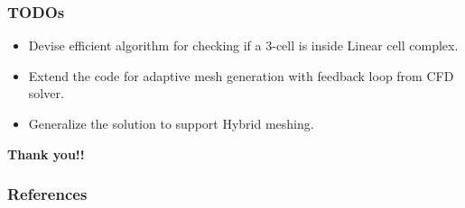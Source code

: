 \documentclass{beamer}
\begin{document}
	\begin{frame}
		\frametitle{TODOs}
			\begin{itemize}
				\item Devise efficient algorithm for checking if a 3-cell is inside Linear cell complex.
				\item Extend the code for adaptive mesh generation with feedback loop from CFD solver. 
				\item Generalize the solution to support Hybrid meshing. 		
			\end{itemize}
		\end{frame}	
	\begin{frame}
		\hspace{3cm}\Huge \textbf{Thank you!!}
	\end{frame}	
\begin{frame}
	\frametitle{References}
		
		
\end{frame}
\end{document}

